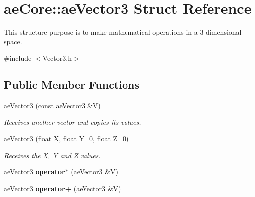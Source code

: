\hypertarget{structae_core_1_1ae_vector3}{}\section{ae\+Core\+:\+:ae\+Vector3 Struct Reference}
\label{structae_core_1_1ae_vector3}


This structure purpose is to make mathematical operations in a 3 dimensional space.  




{\ttfamily \#include $<$Vector3.\+h$>$}

\subsection*{Public Member Functions}
\begin{DoxyCompactItemize}
\item 
\hyperlink{structae_core_1_1ae_vector3_a1bffd7fb87e70d793f579c7d29fd965f}{ae\+Vector3} (const \hyperlink{structae_core_1_1ae_vector3}{ae\+Vector3} \&V)\hypertarget{structae_core_1_1ae_vector3_a1bffd7fb87e70d793f579c7d29fd965f}{}\label{structae_core_1_1ae_vector3_a1bffd7fb87e70d793f579c7d29fd965f}

\begin{DoxyCompactList}\small\item\em Receives another vector and copies its values. \end{DoxyCompactList}\item 
\hyperlink{structae_core_1_1ae_vector3_a2ad1a3d5e07aef4887e48eced217d3b0}{ae\+Vector3} (float X, float Y=0, float Z=0)\hypertarget{structae_core_1_1ae_vector3_a2ad1a3d5e07aef4887e48eced217d3b0}{}\label{structae_core_1_1ae_vector3_a2ad1a3d5e07aef4887e48eced217d3b0}

\begin{DoxyCompactList}\small\item\em Receives the X, Y and Z values. \end{DoxyCompactList}\item 
\hyperlink{structae_core_1_1ae_vector3}{ae\+Vector3} {\bfseries operator$\ast$} (\hyperlink{structae_core_1_1ae_vector3}{ae\+Vector3} \&V)\hypertarget{structae_core_1_1ae_vector3_ad0e245d1fdbb5b3187dcb30353cc2e35}{}\label{structae_core_1_1ae_vector3_ad0e245d1fdbb5b3187dcb30353cc2e35}

\item 
\hyperlink{structae_core_1_1ae_vector3}{ae\+Vector3} {\bfseries operator+} (\hyperlink{structae_core_1_1ae_vector3}{ae\+Vector3} \&V)\hypertarget{structae_core_1_1ae_vector3_a3a61eeb0433d2780778c111e3e374f54}{}\label{structae_core_1_1ae_vector3_a3a61eeb0433d2780778c111e3e374f54}


\end{DoxyCompactItemize}

